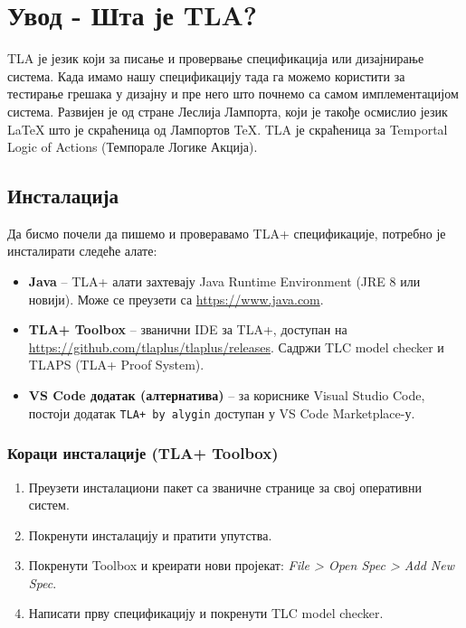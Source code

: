 \section{Увод - Шта је TLA?}
TLA је језик који за писање и провервање спецификација или дизајнирање система.
Када имамо нашу спецификацију тада га можемо користити за
тестирање грешака у дизајну и пре него што почнемо са самом имплементацијом система.
Развијен је од стране Леслија Лампорта, који је такође осмислио језик \LaTeX
што је скраћеница од Лампортов \TeX.
TLA је скраћеница за Temportal Logic of Actions (Темпорале Логике Акција).

\subsection{Инсталација}

Да бисмо почели да пишемо и проверавамо TLA+ спецификације, потребно је инсталирати следеће алате:

\begin{itemize}
    \item \textbf{Java} -- TLA+ алати захтевају Java Runtime Environment (JRE 8 или новији).
    Може се преузети са \url{https://www.java.com}.

    \item \textbf{TLA+ Toolbox} -- званични IDE за TLA+, доступан на
    \url{https://github.com/tlaplus/tlaplus/releases}.
    Садржи TLC model checker и TLAPS (TLA+ Proof System).

    \item \textbf{VS Code додатак (алтернатива)} -- за кориснике Visual Studio Code,
    постоји додатак \texttt{TLA+ by alygin} доступан у VS Code Marketplace-у.
\end{itemize}

\subsubsection{Кораци инсталације (TLA+ Toolbox)}

\begin{enumerate}
    \item Преузети инсталациони пакет са званичне странице за свој оперативни систем.
    \item Покренути инсталацију и пратити упутства.
    \item Покренути Toolbox и креирати нови пројекат: \textit{File > Open Spec > Add New Spec}.
    \item Написати прву спецификацију и покренути TLC model checker.
\end{enumerate}
